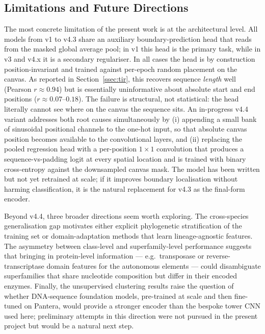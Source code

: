 \documentclass[12pt]{article}
\begin{document}
\subsection{Limitations and Future Directions}\label{ssec:limitations}

The most concrete limitation of the present work is at the architectural level. All models from v1 to v4.3 share an auxiliary boundary-prediction head that reads from the masked global average pool; in v1 this head is the primary task, while in v3 and v4.x it is a secondary regulariser. In all cases the head is by construction position-invariant and trained against per-epoch random placement on the canvas. As reported in Section~\ref{ssec:tir}, this recovers sequence \emph{length} well (Pearson $r \approx 0.94$) but is essentially uninformative about absolute start and end positions ($r \approx 0.07$--$0.18$). The failure is structural, not statistical: the head literally cannot see where on the canvas the sequence sits. An in-progress v4.4 variant addresses both root causes simultaneously by (i) appending a small bank of sinusoidal positional channels to the one-hot input, so that absolute canvas position becomes available to the convolutional layers, and (ii) replacing the pooled regression head with a per-position $1\!\times\!1$ convolution that produces a sequence-vs-padding logit at every spatial location and is trained with binary cross-entropy against the downsampled canvas mask. The model has been written but not yet retrained at scale; if it improves boundary localisation without harming classification, it is the natural replacement for v4.3 as the final-form encoder.

Beyond v4.4, three broader directions seem worth exploring. The cross-species generalisation gap motivates either explicit phylogenetic stratification of the training set or domain-adaptation methods that learn lineage-agnostic features. The asymmetry between class-level and superfamily-level performance suggests that bringing in protein-level information --- e.g.\ transposase or reverse-transcriptase domain features for the autonomous elements --- could disambiguate superfamilies that share nucleotide composition but differ in their encoded enzymes. Finally, the unsupervised clustering results raise the question of whether DNA-sequence foundation models, pre-trained at scale and then fine-tuned on Pantera, would provide a stronger encoder than the bespoke tower CNN used here; preliminary attempts in this direction were not pursued in the present project but would be a natural next step.
\end{document}

